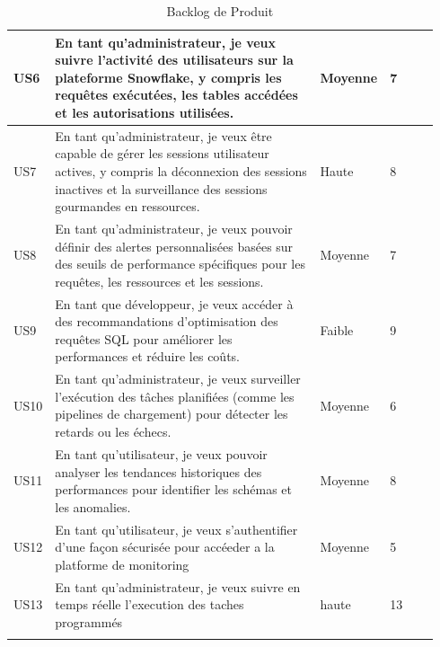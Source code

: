 \begin{center}
\begin{longtable}{|p{0.05\linewidth}|p{0.65\linewidth}|p{0.12\linewidth}|p{0.12\linewidth}|}
        \hline
        
        US6 &  En tant qu'administrateur, je veux suivre l'activité des utilisateurs sur la plateforme Snowflake, y compris les requêtes exécutées, les tables accédées et les autorisations utilisées. & Moyenne & 7 \\
        
        \hline
        
        US7 &  En tant qu'administrateur, je veux être capable de gérer les sessions utilisateur actives, y compris la déconnexion des sessions inactives et la surveillance des sessions gourmandes en ressources. & Haute & 8 \\
        
        \hline
        
        US8 &  En tant qu'administrateur, je veux pouvoir définir des alertes personnalisées basées sur des seuils de performance spécifiques pour les requêtes, les ressources et les sessions. & Moyenne & 7 \\
        
        \hline
        
        US9 &  En tant que développeur, je veux accéder à des recommandations d'optimisation des requêtes SQL pour améliorer les performances et réduire les coûts. & Faible & 9 \\
        
        \hline
        
        US10& En tant qu'administrateur, je veux surveiller l'exécution des tâches planifiées (comme les pipelines de chargement) pour détecter les retards ou les échecs. & Moyenne & 6 \\
        
        \hline
        
        US11 & En tant qu'utilisateur, je veux pouvoir analyser les tendances historiques des performances pour identifier les schémas et les anomalies. & Moyenne & 8 \\
        
        \hline
        
        US12 & En tant qu'utilisateur, je veux s'authentifier d'une façon sécurisée pour accéeder a la platforme de monitoring & Moyenne & 5 \\
        
        \hline
        US13 & En tant qu'administrateur, je veux suivre en temps réelle l'execution des taches programmés  & haute & 13 \\
        
        \hline
        
        \caption{Backlog de Produit}
        \label{tab:backlog_produit}
    \end{longtable}

\end{center}


